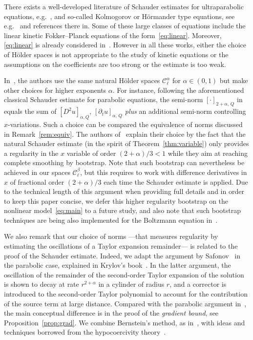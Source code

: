 \documentclass[AHL,Unicode,longabstracts,published]{cedram}
\newcommand{\cC}{\mathcal{C}}
\begin{document}
There exists a well-developed literature of Schauder estimates for ultraparabolic equations, e.g.~\cite{manfredini,polidoro1994}, and so-called Kolmogorov or H\"ormander type equations, see e.g.~\cite{bb,dfp,lunardi1997,radkevich2008} and references there in. Some of these large classes of equations include the linear kinetic Fokker--Planck equations of the form~\eqref{eq:linear}. Moreover, \eqref{eq:linear} is already considered in~\cite{hs}. However in all these works, either the choice of H\"older spaces is not appropriate to the study of kinetic equations or the assumptions on the coefficients are too strong or the estimate is too weak.

In~\cite{hs}, the authors use the same natural H\"older spaces $\cC_\ell^\alpha$ for $\alpha \in (0,1)$ but make other choices for higher exponents $\alpha$. For instance, following the aforementioned classical Schauder estimate for parabolic equations, the semi-norm $[\cdot]_{2+\alpha,\,Q}$ in~\cite{hs} equals the sum of $[D^2u]_{\alpha,Q}$, $[\partial_t u]_{\alpha,\,Q}$ \emph{plus} an additional semi-norm controlling $x$-variations. Such a choice can be compared the equivalence of norms discussed in Remark~\ref{rem:equiv}. The authors of~\cite{hs} explain their choice by the fact that the natural Schauder estimate (in the spirit of Theorem~\ref{thm:variable}) only provides a regularity in the $x$ variable of order $(2+\alpha)/3 <1$ while they aim at reaching complete smoothing by bootstrap. Note that such bootstrap can nevertheless be achieved in our spaces $\cC_\ell^\beta$, but this requires to work with difference derivatives in $x$ of fractional order $(2+\alpha)/3$ each time the Schauder estimate is applied. Due to the technical length of this argument when providing full details and in order to keep this paper concise, we defer this higher regularity bootstrap on the nonlinear model~\eqref{eq:main} to a future study, and also note that such bootstrap techniques are being also implemented for the Boltzmann equation in~\cite{bootstrap}.

We also remark that our choice of norms ---that measures regularity by estimating the oscillations of a Taylor expansion remainder--- is related to the proof of the Schauder estimate. Indeed, we adapt the argument by Safonov~\cite{safonov1984} in the parabolic case, explained in Krylov's book~\cite{krylov1996}. In the latter argument, the oscillation of the remainder of the second-order Taylor expansion of the solution is shown to decay at rate $r^{2+\alpha}$ in a cylinder of radius $r$, and a corrector is introduced to the second-order Taylor polynomial to account for the contribution of the source term at large distance. Compared with the parabolic argument in~\cite{krylov1996}, the main conceptual difference is in the proof of the \emph{gradient bound}, see Proposition~\ref{prop:grad}. We combine Bernstein's method, as in~\cite{krylov1996}, with ideas and techniques borrowed from the hypocoercivity theory~\cite{villani2009memoir}.
\end{document}
